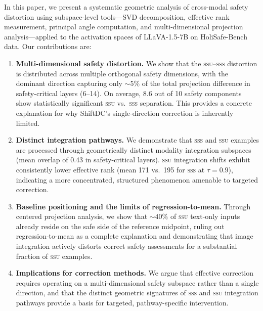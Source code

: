 \documentclass{article}
\newcommand{\ssu}{\textsc{ssu}}
\newcommand{\sss}{\textsc{sss}}
\begin{document}
In this paper, we present a systematic geometric analysis of cross-modal safety
distortion using subspace-level tools---SVD decomposition, effective rank
measurement, principal angle computation, and multi-dimensional projection
analysis---applied to the activation spaces of LLaVA-1.5-7B on HoliSafe-Bench
data.  Our contributions are:

\begin{enumerate}
  \item \textbf{Multi-dimensional safety distortion.}  We show that the
        \ssu--\sss{} distortion is distributed across multiple orthogonal safety
        dimensions, with the dominant direction capturing only ${\sim}5\%$ of the
        total projection difference in safety-critical layers (6--14).  On
        average, 8.6 out of 10 safety components show statistically significant
        \ssu{} vs.\ \sss{} separation.  This provides a concrete explanation for
        why ShiftDC's single-direction correction is inherently limited.

  \item \textbf{Distinct integration pathways.}  We demonstrate that \sss{} and
        \ssu{} examples are processed through geometrically distinct modality
        integration subspaces (mean overlap of 0.43 in safety-critical layers).
        \ssu{} integration shifts exhibit consistently lower effective rank (mean
        171 vs.\ 195 for \sss{} at $\tau{=}0.9$), indicating a more concentrated,
        structured phenomenon amenable to targeted correction.

  \item \textbf{Baseline positioning and the limits of regression-to-mean.}
        Through centered projection analysis, we show that ${\sim}40\%$ of \ssu{}
        text-only inputs already reside on the safe side of the reference
        midpoint, ruling out regression-to-mean as a complete explanation and
        demonstrating that image integration actively distorts correct safety
        assessments for a substantial fraction of \ssu{} examples.

  \item \textbf{Implications for correction methods.}  We argue that effective
        correction requires operating on a multi-dimensional safety subspace
        rather than a single direction, and that the distinct geometric signatures
        of \sss{} and \ssu{} integration pathways provide a basis for targeted,
        pathway-specific intervention.
\end{enumerate}
\end{document}
